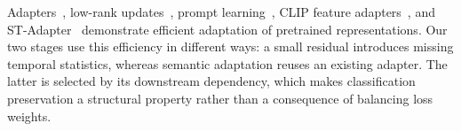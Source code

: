 Adapters~\cite{houlsby2019adapter}, low-rank updates~\cite{hu2021lora}, prompt learning~\cite{zhou2022coop}, CLIP feature adapters~\cite{gao2024clipadapter}, and ST-Adapter~\cite{pan2022stadapter} demonstrate efficient adaptation of pretrained representations. Our two stages use this efficiency in different ways: a small residual introduces missing temporal statistics, whereas semantic adaptation reuses an existing adapter. The latter is selected by its downstream dependency, which makes classification preservation a structural property rather than a consequence of balancing loss weights.
